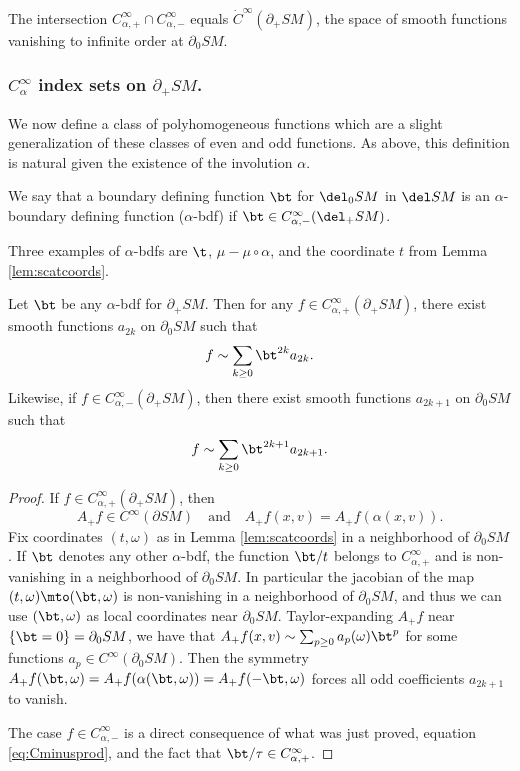 The intersection $C_{\alpha,+}^\infty\cap C_{\alpha,-}^\infty$ equals $\dot C^\infty(\partial_+ SM)$, the space of
smooth functions vanishing to infinite order at $\partial_0 SM$.

\subsubsection*{$C_\alpha^\infty$ index sets on $\partial_+ SM$.} We now define a class of polyhomogeneous functions which are a slight generalization of these classes of even and odd functions. As above, this definition is natural given the existence of the involution $\alpha$.

\begin{Definition}
We say that a boundary defining function $\bt$ for $\del_0 SM$ in $\del SM$ is an $\alpha$-boundary defining function ($\alpha$-bdf) if $\bt\in C_{\alpha,-}^\infty(\del_+ SM)$.
\end{Definition}
Three examples of $\alpha$-bdfs are $\t$, $\mu - \mu \circ \alpha$, and the coordinate $t$ from Lemma \ref{lem:scatcoords}.

\begin{Lemma}\label{lem:bdfexpansion}
Let $\bt$ be any $\alpha$-bdf for $\partial_+ SM$. Then for any $f\in C^\infty_{\alpha,+} (\partial_+ SM)$, there exist smooth functions $a_{2k}$ on $\partial_0 SM$ such that
\begin{equation*}
f \sim \sum_{k\ge 0} \bt^{2k} a_{2k}.
\end{equation*}
Likewise, if $f\in C^\infty_{\alpha,-} (\partial_+ SM)$, then there exist smooth functions $a_{2k+1}$ on $\partial_0 SM$ such that
\begin{equation*}
f \sim \sum_{k\ge 0} \bt^{2k+1} a_{2k+1}.
\end{equation*}
\end{Lemma}
\begin{proof}
If $f\in C_{\alpha,+}^\infty(\partial_+ SM)$, then
\[
A_+ f\in C^\infty(\partial SM)\quad\text{and}\quad A_+ f(x,v) = A_+ f(\alpha(x,v)).
\]
Fix coordinates $(t,\omega)$ as in Lemma \ref{lem:scatcoords} in a neighborhood of $\partial_0 SM$. If $\bt$ denotes any other $\alpha$-bdf, the function $\bt/t$ belongs to $C_{\alpha,+}^\infty$ and is non-vanishing in a neighborhood of $\partial_0 SM$. In particular the jacobian of the map $(t,\omega)\mto (\bt,\omega)$ is non-vanishing in a neighborhood of $\partial_0 SM$, and thus we can use $(\bt,\omega)$ as local coordinates near $\partial_0 SM$. Taylor-expanding $A_+ f$ near $\{ \bt =0 \} = \partial_0 SM$, we have that $A_+ f(x,v) \sim \sum_{p\ge 0} a_p(\omega) \bt^p$ for some functions $a_p\in C^\infty(\partial_0 SM)$. Then the symmetry $A_+ f(\bt,\omega) = A_+ f(\alpha(\bt,\omega)) = A_+ f (-\bt,\omega)$ forces all odd coefficients $a_{2k+1}$ to vanish.

The case $f\in C_{\alpha,-}^\infty$ is a direct consequence of what was just proved, equation \eqref{eq:Cminusprod}, and the fact that $\bt/\tau\in C^{\infty}_{\alpha,+}$.
\end{proof}

